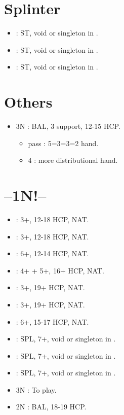 \documentclass[12pt,twoside,a5paper]{report}%
\begin{document}
	\section*{Splinter}
	\begin{itemize}
	\renewcommand{\labelitemi}{}
	\item {} : ST, void or singleton in \cl{}.
	\item {} : ST, void or singleton in \di{}.
	\item {} : ST, void or singleton in \sp{}.
	\end{itemize}

	\section*{Others}
	\begin{itemize}
	\renewcommand{\labelitemi}{}
	\item 3N : BAL, 3\he{} support, 12-15 HCP.
		\begin{itemize}
		\renewcommand{\labelitemi}{--}
		\item pass : 5=3=3=2 hand.
		\item 4\he{} : more distributional hand.
		\end{itemize}
	\end{itemize}
	
	\section*{--1N!--}
	\begin{itemize}
	\renewcommand{\labelitemi}{}
	\item {} : 3+\cl{}, 12-18 HCP, NAT.
	\item {} : 3+\di{}, 12-18 HCP, NAT.
	\item {} : 6+\he{}, 12-14 HCP, NAT.
	\item {} : 4+\sp{} + 5+\he{}, 16+ HCP, NAT.
	\item {} : 3+\cl{}, 19+ HCP, NAT.
	\item {} : 3+\di{}, 19+ HCP, NAT.
	\item {} : 6+\he{}, 15-17 HCP, NAT.
	\item {} : SPL, 7+\he{}, void or singleton in \sp{}. 
	\item {} : SPL, 7+\he{}, void or singleton in \cl{}.
	\item {} : SPL, 7+\he{}, void or singleton in \di{}.
	\item 3N : To play.
	\item 2N : BAL, 18-19 HCP.
	\end{itemize}
\end{document}
